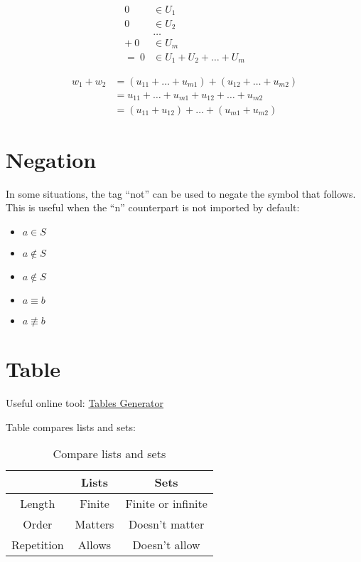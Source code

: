 \documentclass[12pt, letterpaper, oneside]{article}
\begin{document}
\begin{align*}
  0     & \in U_1                      \\
  0     & \in U_2                      \\
        & \ldots                       \\
  + \ 0 & \in U_m                      \\
  = \ 0 & \in U_1 + U_2 + \ldots + U_m
\end{align*}

\begin{align*}
  w_1 + w_2 & = (u_{11} + \ldots + u_{m1}) + (u_{12} + \ldots + u_{m2}) \\
            & = u_{11} + \ldots + u_{m1} + u_{12} + \ldots + u_{m2}     \\
            & = (u_{11} + u_{12}) + \ldots + (u_{m1} + u_{m2})
\end{align*}

\section{Negation}

In some situations, the tag ``not'' can be used to negate the symbol that follows. This is useful when the ``n''
counterpart is not imported by default:

\begin{itemize}
  \item $a \in S$
  \item $a \notin S$
  \item $a \not\in S$
  \item $a \equiv b$
  \item $a \not\equiv b$
\end{itemize}

\section{Table}

Useful online tool: \href{https://www.tablesgenerator.com/}{Tables Generator}

Table compares lists and sets:
\begin{table}[H]
  \centering
  \begin{tabular}{||c c c ||}
    \hline
               & Lists   & Sets               \\ [0.5ex]
    \hline
    \hline
    Length     & Finite  & Finite or infinite \\
    Order      & Matters & Doesn't matter     \\
    Repetition & Allows  & Doesn't allow      \\ [1ex]
    \hline
  \end{tabular}
  \caption{Compare lists and sets}
  \label{table:lists_sets_comp}
\end{table}
\end{document}
